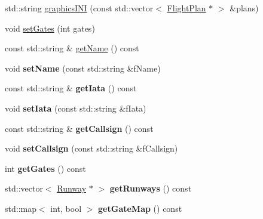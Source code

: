 \begin{DoxyCompactItemize}
\item 
std\+::string \hyperlink{classAirport_aa280a5763b0dbc605e46b951b4e7781b}{graphics\+I\+NI} (const std\+::vector$<$ \hyperlink{classFlightPlan}{Flight\+Plan} $\ast$ $>$ \&plans)
\item 
void \hyperlink{classAirport_a9c7d8fabce9110b49c2b9426e9527420}{set\+Gates} (int gates)
\item 
const std\+::string \& \hyperlink{classAirport_a9b6eb908a82342b64dda9a72f9369d43}{get\+Name} () const 
\item 
void {\bfseries set\+Name} (const std\+::string \&f\+Name)\hypertarget{classAirport_a72a44055d44906f95c38076086d59593}{}\label{classAirport_a72a44055d44906f95c38076086d59593}

\item 
const std\+::string \& {\bfseries get\+Iata} () const \hypertarget{classAirport_a4550198ddc92d3583a0f3c31278189b2}{}\label{classAirport_a4550198ddc92d3583a0f3c31278189b2}

\item 
void {\bfseries set\+Iata} (const std\+::string \&f\+Iata)\hypertarget{classAirport_a1e2cdca63de4684afa01261658c7a56a}{}\label{classAirport_a1e2cdca63de4684afa01261658c7a56a}

\item 
const std\+::string \& {\bfseries get\+Callsign} () const \hypertarget{classAirport_a6ed56e05a8c881b8e4718a34ba9cccc5}{}\label{classAirport_a6ed56e05a8c881b8e4718a34ba9cccc5}

\item 
void {\bfseries set\+Callsign} (const std\+::string \&f\+Callsign)\hypertarget{classAirport_a2824907ce62938bf83aefd3384cba216}{}\label{classAirport_a2824907ce62938bf83aefd3384cba216}

\item 
int {\bfseries get\+Gates} () const \hypertarget{classAirport_a4d23d65ad0ba4d3878e9e32429dd9286}{}\label{classAirport_a4d23d65ad0ba4d3878e9e32429dd9286}

\item 
std\+::vector$<$ \hyperlink{classRunway}{Runway} $\ast$ $>$ {\bfseries get\+Runways} () const \hypertarget{classAirport_a14310ffeba8a024105071c156fd42cf7}{}\label{classAirport_a14310ffeba8a024105071c156fd42cf7}

\item 
std\+::map$<$ int, bool $>$ {\bfseries get\+Gate\+Map} () const \hypertarget{classAirport_acaf321951a6657d167046d7bbc87cdd9}{}\label{classAirport_acaf321951a6657d167046d7bbc87cdd9}

\end{DoxyCompactItemize}


